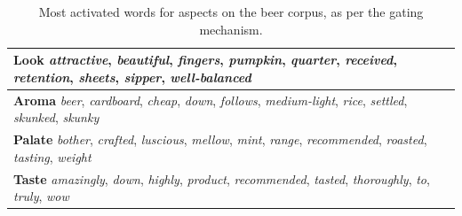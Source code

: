 \documentclass[11pt,a4paper]{article}
\begin{document}
\begin{table}%
\vspace{-.5em}
\footnotesize
\centering
\begin{tabularx}{\columnwidth}{X} 
{\bf Look} \emph{attractive}, \emph{beautiful}, \emph{fingers}, \emph{pumpkin}, \emph{quarter}, \emph{received}, \emph{retention}, \emph{sheets}, \emph{sipper}, \emph{well-balanced} \\\hline 
{\bf Aroma} \emph{beer}, \emph{cardboard}, \emph{cheap}, \emph{down}, \emph{follows}, \emph{medium-light}, \emph{rice}, \emph{settled}, \emph{skunked}, \emph{skunky} \\\hline 
{\bf Palate} \emph{bother}, \emph{crafted}, \emph{luscious}, \emph{mellow}, \emph{mint}, \emph{range}, \emph{recommended}, \emph{roasted}, \emph{tasting}, \emph{weight} \\\hline 
{\bf Taste} \emph{amazingly}, \emph{down}, \emph{highly}, \emph{product}, \emph{recommended}, \emph{tasted}, \emph{thoroughly}, \emph{to}, \emph{truly}, \emph{wow} \\
\end{tabularx}
\caption{Most activated words for aspects on the beer corpus, as per the gating mechanism.}
\label{table:Beermost}
\vspace{-1em}
\end{table}
\end{document}
